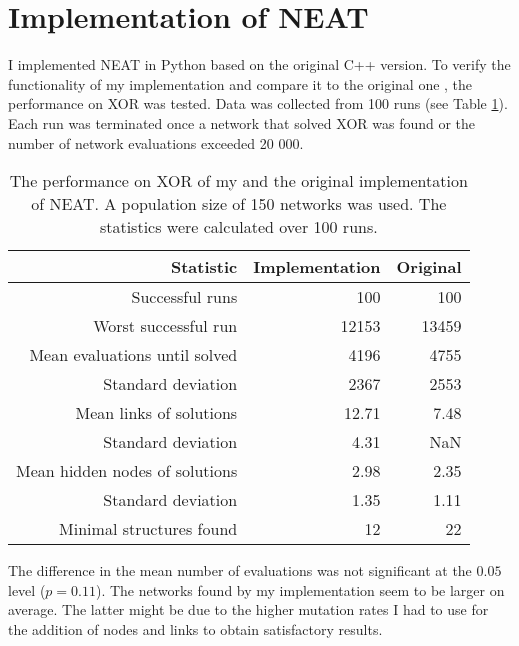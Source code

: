 \section{Implementation of NEAT}

I implemented NEAT in Python based on the original C++ version. To verify the functionality of my implementation and compare it to
the original one \cite{neat_main}, the performance on XOR was tested. Data was collected from 100 runs (see Table \ref{xor_verification}).
Each run was terminated once a network that solved XOR was found or the number of network evaluations exceeded 20 000.
\begin{table}[H]
    \centering
    \begin{tabular}{rrr}
    \toprule
    Statistic & \multicolumn{1}{r}{Implementation} & \multicolumn{1}{r}{Original \cite{neat_main}} \\
    \midrule
    Successful runs & 100 & 100 \\
    Worst successful run & 12153 & 13459 \\
    \rowcolor[gray]{.9} Mean evaluations until solved & 4196 & 4755\\
    Standard deviation & 2367 & 2553\\
    \rowcolor[gray]{.9} Mean links of solutions & 12.71 & 7.48\\
    Standard deviation & 4.31 & NaN\\
    \rowcolor[gray]{.9} Mean hidden nodes of solutions & 2.98 & 2.35\\
    Standard deviation & 1.35 & 1.11\\
    Minimal structures found & 12 & 22\\
    \bottomrule
    \end{tabular}
    \caption{The performance on XOR of my and the original implementation of NEAT. A population size of 150 networks was used.
             The statistics were calculated over 100 runs.}
    \label{xor_verification}
\end{table}
The difference in the mean number of evaluations was not significant at the $0.05$ level ($p=0.11$).
The networks found by my implementation seem to be larger on average.
The latter might be due to the higher mutation rates I had to use for the addition of nodes and links
to obtain satisfactory results.
